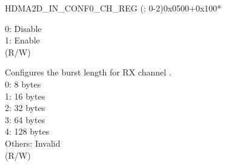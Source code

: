 \begin{register}{H}{DMA2D\_IN\_CONF0\_CH\_REG (: 0-2)}{0x0500+0x100*}
\begin{regdesc}
\begin{reglist}
0: Disable\\
1: Enable\\ (R/W)
\label{fielddesc:DMA2DINMEMBURSTLENGTHCHN}\item [DMA2D\_IN\_MEM\_BURST\_LENGTH\_CH\regindex{n}] Configures the burst length for RX channel .\\
0: 8 bytes\\
1: 16 bytes\\
2: 32 bytes\\
3: 64 bytes\\
4: 128 bytes\\
Others: Invalid\\ (R/W)

\item [Continued on the next page...]
\end{reglist}\end{regdesc}
\end{register}

